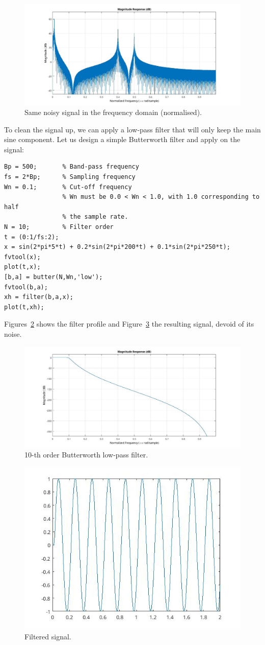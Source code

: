 \documentclass{../template/labo}
\begin{document}
\begin{figure}[ht!]
\centering
\includegraphics[width=.8\textwidth]{sin-noisy-fvtool.jpg}
\caption{Same noisy signal in the frequency domain (normalised).}
\label{fig:sin-noisy-fvtool}
\end{figure}

To clean the signal up, we can apply a low-pass filter that will only keep the main sine component. Let us design a simple Butterworth filter and apply on the signal:
\begin{verbatim}
Bp = 500;       % Band-pass frequency
fs = 2*Bp;      % Sampling frequency
Wn = 0.1;       % Cut-off frequency
                % Wn must be 0.0 < Wn < 1.0, with 1.0 corresponding to half
                % the sample rate.
N = 10;         % Filter order
t = (0:1/fs:2);
x = sin(2*pi*5*t) + 0.2*sin(2*pi*200*t) + 0.1*sin(2*pi*250*t);
fvtool(x);
plot(t,x);
[b,a] = butter(N,Wn,'low');
fvtool(b,a);
xh = filter(b,a,x);
plot(t,xh);
\end{verbatim}

Figures~\ref{fig:butter-10} shows the filter profile and Figure~\ref{fig:sine-clean} the resulting signal, devoid of its noise.

\begin{figure}[ht!]
\centering
\includegraphics[width=.8\textwidth]{butter-10.jpg}
\caption{10-th order Butterworth low-pass filter.}
\label{fig:butter-10}
\end{figure}

\begin{figure}[ht!]
\centering
\includegraphics[width=.6\textwidth]{sin-clean.jpg}
\caption{Filtered signal.}
\label{fig:sine-clean}
\end{figure}
\end{document}
